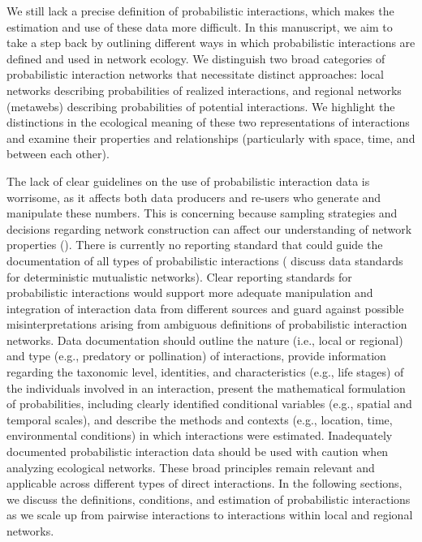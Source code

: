 We still lack a precise definition of probabilistic interactions, which makes
the estimation and use of these data more difficult. In this manuscript, we aim
to take a step back by outlining different ways in which probabilistic
interactions are defined and used in network ecology. We distinguish two broad
categories of probabilistic interaction networks that necessitate distinct
approaches: local networks describing probabilities of realized interactions,
and regional networks (metawebs) describing probabilities of potential
interactions. We highlight the distinctions in the ecological meaning of these
two representations of interactions and examine their properties and
relationships (particularly with space, time, and between each other). 

The lack of clear guidelines on the use of probabilistic interaction data is
worrisome, as it affects both data producers and re-users who generate and
manipulate these numbers. This is concerning because sampling strategies and
decisions regarding network construction can affect our understanding of network
properties (\cite{Brimacombe2023Shortcomings}). There is currently no reporting
standard that could guide the documentation of all types of probabilistic
interactions (\cite{Salim2022Data} discuss data standards for deterministic
mutualistic networks). Clear reporting standards for probabilistic interactions
would support more adequate manipulation and integration of interaction data
from different sources and guard against possible misinterpretations arising
from ambiguous definitions of probabilistic interaction networks. Data
documentation should outline the nature (i.e., local or regional) and type
(e.g., predatory or pollination) of interactions, provide information regarding
the taxonomic level, identities, and characteristics (e.g., life stages) of the
individuals involved in an interaction, present the mathematical formulation of
probabilities, including clearly identified conditional variables (e.g., spatial
and temporal scales), and describe the methods and contexts (e.g., location,
time, environmental conditions) in which interactions were estimated.
Inadequately documented probabilistic interaction data should be used with
caution when analyzing ecological networks. These broad principles remain
relevant and applicable across different types of direct interactions. In the
following sections, we discuss the definitions, conditions, and estimation of
probabilistic interactions as we scale up from pairwise interactions to
interactions within local and regional networks.


